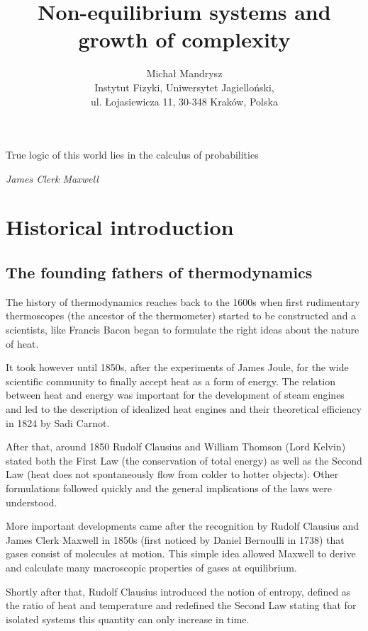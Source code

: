 \documentclass[a4paper,12pt]{article}
\begin{document}
\title{Non-equilibrium systems and growth of complexity}

\author{Michał Mandrysz \\
Instytut Fizyki, Uniwersytet Jagielloński, \\ul. Łojasiewicza
11, 30-348 Kraków, Polska }



\maketitle

\tableofcontents

\newpage
\epigraph{True logic of this world lies in the calculus of probabilities}{\textit{James Clerk Maxwell}}

\section{Historical introduction}
\subsection{The founding fathers of thermodynamics}
The history of thermodynamics reaches back to the 1600s when first rudimentary thermoscopes (the ancestor of the thermometer) started to be constructed and a scientists, like Francis Bacon began to formulate the right ideas about the nature of heat. 

It took however until 1850s, after the experiments of James Joule, for the wide scientific community to finally accept heat as a form of energy. The relation between heat and energy was important for the development of steam engines and led to the description of idealized heat engines and their theoretical efficiency in 1824 by Sadi Carnot. 

After that, around 1850 Rudolf Clausius and William Thomson (Lord Kelvin) stated both the First Law (the conservation of total energy) as well as the Second Law (heat does not spontaneously flow from colder to hotter objects). Other formulations followed quickly and the general implications of the laws were understood. 

More important developments came after the recognition by Rudolf Clausius and James Clerk Maxwell in 1850s (first noticed by Daniel Bernoulli in 1738) that gases consist of molecules at motion. This simple idea allowed Maxwell to derive and calculate many macroscopic properties of gases at equilibrium. 

Shortly after that, Rudolf Clausius introduced the notion of entropy, defined as the ratio of heat and temperature and redefined the Second Law stating that for isolated systems this quantity can only increase in time.
\end{document}
